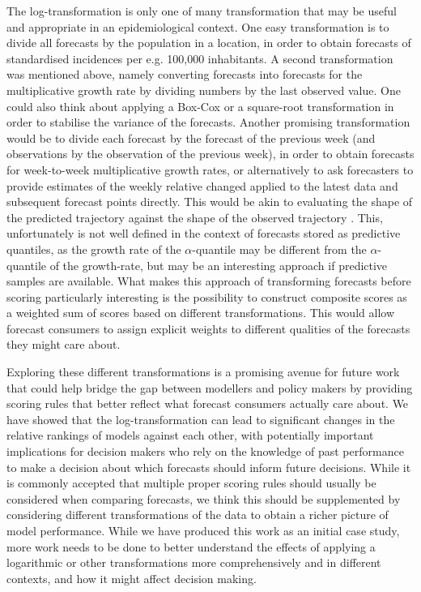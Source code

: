 \documentclass{article}
\begin{document}
The log-transformation is only one of many transformation that may be useful and appropriate in an epidemiological context. One easy transformation is to divide all forecasts by the population in a location, in order to obtain forecasts of standardised incidences per e.g. 100,000 inhabitants. A second transformation was mentioned above, namely converting forecasts into forecasts for the multiplicative growth rate by dividing numbers by the last observed value. One could also think about applying a Box-Cox or a square-root transformation in order to stabilise the variance of the forecasts. Another promising transformation would be to divide each forecast by the forecast of the previous week (and observations by the observation of the previous week), in order to obtain forecasts for week-to-week multiplicative growth rates, or alternatively to ask forecasters to provide estimates of the weekly relative changed applied to the latest data and subsequent forecast points directly. This would be akin to evaluating the shape of the predicted trajectory against the shape of the observed trajectory \citep[for a different approach to evaluation the shape of a forecast, see][]{srivastavaShapebasedEvaluationEpidemic2022}. This, unfortunately is not well defined in the context of forecasts stored as predictive quantiles, as the growth rate of the $\alpha$-quantile may be different from the $\alpha$-quantile of the growth-rate, but may be an interesting approach if predictive samples are available. What makes this approach of transforming forecasts before scoring particularly interesting is the possibility to construct composite scores as a weighted sum of scores based on different transformations. This would allow forecast consumers to assign explicit weights to different qualities of the forecasts they might care about. 

Exploring these different transformations is a promising avenue for future work that could help bridge the gap between modellers and policy makers by providing scoring rules that better reflect what forecast consumers actually care about. We have showed that the log-transformation can lead to significant changes in the relative rankings of models against each other, with potentially important implications for decision makers who rely on the knowledge of past performance to make a decision about which forecasts should inform future decisions. While it is commonly accepted that multiple proper scoring rules should usually be considered when comparing forecasts, we think this should be supplemented by considering different transformations of the data to obtain a richer picture of model performance. While we have produced this work as an initial case study, more work needs to be done to better understand the effects of applying a logarithmic or other transformations more comprehensively and in different contexts, and how it might affect decision making. 
\end{document}

